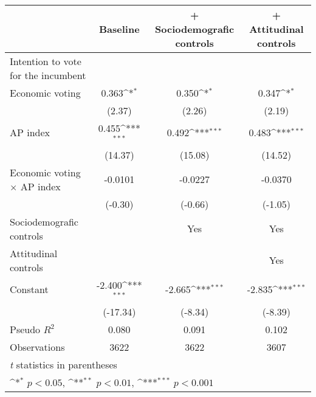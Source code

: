 {
\def\sym#1{\ifmmode^{#1}\else\(^{#1}\)\fi}
\begin{tabular}{l*{3}{c}}
\toprule
                & Baseline         &+ Sociodemografic controls         &+ Attitudinal controls         \\
\midrule
Intention to vote for the incumbent&                  &                  &                  \\
Economic voting &    0.363\sym{*}  &    0.350\sym{*}  &    0.347\sym{*}  \\
                &   (2.37)         &   (2.26)         &   (2.19)         \\
AP index        &    0.455\sym{***}&    0.492\sym{***}&    0.483\sym{***}\\
                &  (14.37)         &  (15.08)         &  (14.52)         \\
Economic voting $\times$ AP index&  -0.0101         &  -0.0227         &  -0.0370         \\
                &  (-0.30)         &  (-0.66)         &  (-1.05)         \\
Sociodemografic controls&                  &      Yes         &      Yes         \\

Attitudinal controls&                  &                  &      Yes         \\

Constant        &   -2.400\sym{***}&   -2.665\sym{***}&   -2.835\sym{***}\\
                & (-17.34)         &  (-8.34)         &  (-8.39)         \\
\midrule
Pseudo \(R^{2}\)&    0.080         &    0.091         &    0.102         \\
Observations    &     3622         &     3622         &     3607         \\
\bottomrule
\multicolumn{4}{l}{\footnotesize \textit{t} statistics in parentheses}\\
\multicolumn{4}{l}{\footnotesize \sym{*} \(p<0.05\), \sym{**} \(p<0.01\), \sym{***} \(p<0.001\)}\\
\end{tabular}
}
